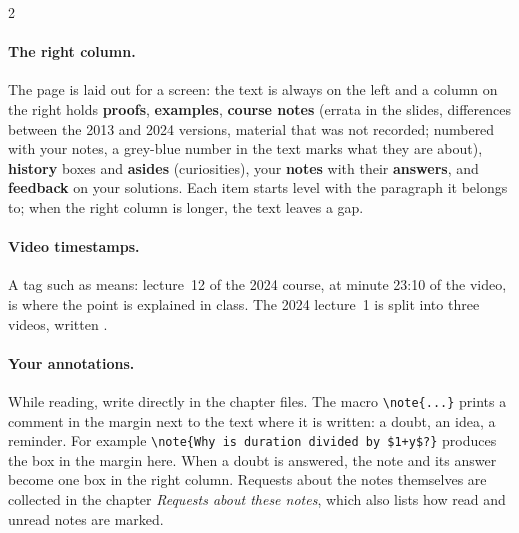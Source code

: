 \documentclass[11pt,oneside,openany]{book}
\begin{document}
\begin{paracol}{2}
\paragraph{The right column.} The page is laid out for a screen: the text is always on the left and a
column on the right holds \textcolor{thmcol}{\textbf{proofs}}, \textcolor{intcol}{\textbf{examples}},
\textcolor{srccol}{\textbf{course notes}} (errata in the slides, differences between the 2013 and 2024
versions, material that was not recorded; numbered with your notes, a grey-blue number in the text marks
what they are about), \textcolor{histcol}{\textbf{history}} boxes and
\textcolor{histcol}{\textbf{asides}} (curiosities), your \textcolor{notecol!80!black}{\textbf{notes}} with their
\textcolor{anscol}{\textbf{answers}}, and \textcolor{exerdark}{\textbf{feedback}} on your solutions. Each item
starts level with the paragraph it belongs to; when the right column is longer, the text leaves a gap.

\paragraph{Video timestamps.} A tag such as  means: lecture~12 of the 2024
course, at minute 23:10 of the video, is where the point is explained in class. The 2024
lecture~1 is split into three videos, written .

\paragraph{Your annotations.} While reading, write directly in the chapter files. The macro \verb|\note{...}| prints a comment in the margin next to the text where it is written: a doubt, an idea, a reminder. For example \verb|\note{Why is duration divided by $1+y$?}| produces the box in the margin here. When a doubt is answered, the note and its answer become one box in the right column. Requests about the notes themselves are collected in the chapter \emph{Requests about these notes}, which also lists how read and unread notes are marked.

\flushside
\end{paracol}



\tableofcontents

\mainmatter
\end{document}
